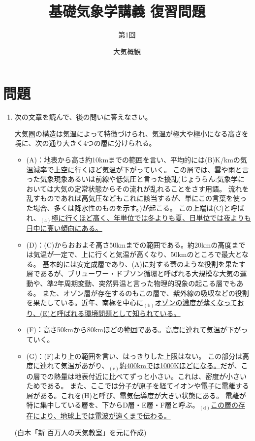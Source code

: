 \documentclass{jsarticle}
\newenvironment{problems}
{
  \renewcommand\labelenumi{\doublebox{\arabic{enumi}}}
  \begin{enumerate}
}{
  \end{enumerate}
  \renewcommand\labelenumi{\arabic{enumi}.}
}
\begin{document}
\title{基礎気象学講義 復習問題} %
\author{第1回} %
\date{大気概観} %
\maketitle

\section{問題}

    \begin{problems}
    \item 次の文章を読んで、後の問いに答えなさい。
        \begin{screen}
        大気圏の構造は気温によって特徴づけられ、気温が極大や極小になる高さを境に、次の通り大きく4つの層に分けられる。

            \begin{itemize}
            \item (A)：地表から高さ約10kmまでの範囲を言い、平均的には(B)K/kmの気温減率で上空に行くほど気温が下がっていく。
            この層では、雲や雨と言った気象現象あるいは前線や低気圧と言った擾乱(じょうらん:気象学においては大気の定常状態からその流れが乱れることをさす用語。
            流れを乱すものであれば高気圧などもこれに該当するが、単にこの言葉を使った場合、多くは降水性のものを示す。)が起こる。
            この上端は(C)と呼ばれ、$_{(\mathrm{a})}$\underline{極に行くほど高く、年単位では冬よりも夏、日単位では夜よりも日中に高い傾向にある。}
            \item (D)：(C)からおおよそ高さ50kmまでの範囲である。約20kmの高度までは気温が一定で、上に行くと気温が高くなり、50kmのところで最大となる。
            基本的には安定成層であり、(A)に対する蓋のような役割を果たす層であるが、ブリューワー・ドブソン循環と呼ばれる大規模な大気の運動や、準2年周期変動、突然昇温と言った物理的現象の起こる層でもある。
            また、オゾン層が存在するのもこの層で、紫外線の吸収などの役割を果たしている。近年、南極を中心に$_{(\mathrm{b})}$\underline{オゾンの濃度が薄くなっており、(E)と呼ばれる環境問題として知られている。}
            \item (F)：高さ50kmから80kmほどの範囲である。高度に連れて気温が下がっていく。
            \item (G)：(F)より上の範囲を言い、はっきりした上限はない。
            この部分は高度に連れて気温があがり、$_{(\mathrm{c})}$\underline{約400kmでは1000Kほどになる。}だが、この層での熱量は地表付近に比べてずっと小さい。これは、密度が小さいためである。
            また、ここでは分子が原子を経てイオンや電子に電離する層がある。これを(H)と呼び、電気伝導度が大きい状態にある。
            電離が特に集中している層を、下からD層・E層・F層と呼ぶ。$_{(\mathrm{d})}$\underline{この層の存在により、地球上では電波が遠くまで伝わる。}
            \end{itemize}
            \begin{flushright}
            (白木「新 百万人の天気教室」を元に作成)
            \end{flushright}
        \end{screen}


\end{problems}
\end{document}
